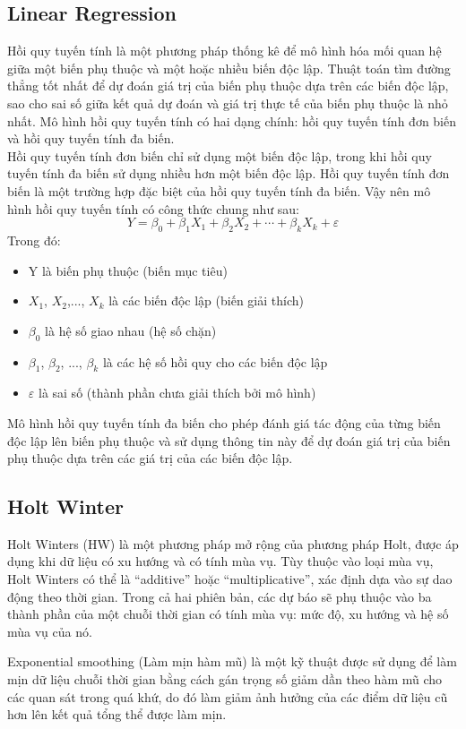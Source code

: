\documentclass[conference]{IEEEtran}
\begin{document}
\subsection{Linear Regression}
Hồi quy tuyến tính là một phương pháp thống kê để mô hình hóa mối quan hệ giữa một biến phụ thuộc và một hoặc nhiều biến độc lập. Thuật toán tìm đường thẳng tốt nhất để dự đoán giá trị của biến phụ thuộc dựa trên các biến độc lập, sao cho sai số giữa kết quả dự đoán và giá trị thực tế của biến phụ thuộc là nhỏ nhất. Mô hình hồi quy tuyến tính có hai dạng chính: hồi quy tuyến tính đơn biến và hồi quy tuyến tính đa biến.\\
Hồi quy tuyến tính đơn biến chỉ sử dụng một biến độc lập, trong khi hồi quy tuyến tính đa biến sử dụng nhiều hơn một biến độc lập. Hồi quy tuyến tính đơn biến là một trường hợp đặc biệt của hồi quy tuyến tính đa biến. Vậy nên mô hình hồi quy tuyến tính có công thức chung như sau:
\cite{linearRegressionMethod} 
\[Y=\beta_0+\beta_1X_1+\beta_2X_2+\cdots+\beta_kX_k+\varepsilon\]
Trong đó:
\begin{itemize}
    \item Y là biến phụ thuộc (biến mục tiêu)
    \item $X_1$, $X_2$,..., $X_k$ là các biến độc lập (biến giải thích)
    \item $\beta_0$ là hệ số giao nhau (hệ số chặn)
    \item $β_1$, $β_2$, ..., $β_k$ là các hệ số hồi quy cho các biến độc lập
    \item $\varepsilon$ là sai số (thành phần chưa giải thích bởi mô hình)
\end{itemize}
Mô hình hồi quy tuyến tính đa biến cho phép đánh giá tác động của từng biến độc lập lên biến phụ thuộc và sử dụng thông tin này để dự đoán giá trị của biến phụ thuộc dựa trên các giá trị của các biến độc lập.

\subsection{Holt Winter}
Holt Winters (HW) là một phương pháp mở rộng của phương pháp Holt, được áp dụng khi dữ liệu có xu hướng và có tính mùa vụ. Tùy thuộc vào loại mùa vụ, Holt Winters có thể là “additive”  hoặc “multiplicative”, xác định dựa vào sự dao động theo thời gian. Trong cả hai phiên bản, các dự báo sẽ phụ thuộc vào ba thành phần của một chuỗi thời gian có tính mùa vụ: mức độ, xu hướng và hệ số mùa vụ của nó. \cite{HoltWinter1} 

Exponential smoothing (Làm mịn hàm mũ) là một kỹ thuật được sử dụng để làm mịn dữ liệu chuỗi thời gian bằng cách gán trọng số giảm dần theo hàm mũ cho các quan sát trong quá khứ, do đó làm giảm ảnh hưởng của các điểm dữ liệu cũ hơn lên kết quả tổng thể được làm mịn.
\end{document}
